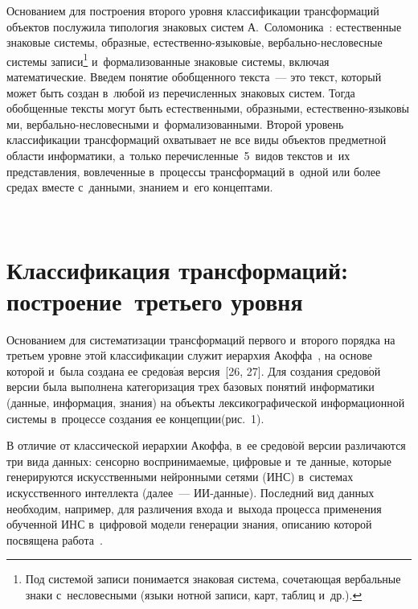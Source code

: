 \begin{multicols}{2}
Основанием для построения второго уровня классификации трансформаций объектов послужила типология 
знаковых сис\-тем А.~Соломоника~\cite[c.~131]{25-zac}: естественные знаковые сис\-те\-мы, образные,  
ес\-тест\-вен\-но-язы\-ко\-в$\acute{\mbox{ы}}$е,  
вер\-баль\-но-не\-сло\-вес\-ные сис\-те\-мы записи\footnote{Под системой записи понимается знаковая 
система, сочетающая вербальные знаки с~несловесными (языки нотной записи, карт, таблиц и~др.).} 
и~формализованные знаковые сис\-те\-мы, включая математические. Введем понятие обобщенного текста~--- 
это текст, который может быть создан в~любой из перечисленных знаковых систем. Тогда обобщенные тексты 
могут быть естественными, образными, ес\-тест\-вен\-но-язы\-ко\-в$\acute{\mbox{ы}}$\-ми,  
вер\-баль\-но-не\-сло\-вес\-ны\-ми и~формализованными. Второй уровень классификации трансформаций 
охватывает не все виды объектов предметной  
об\-ласти информатики, а~только перечисленные~5~видов текс\-тов и~их представления, вовлеченные 
в~процессы трансформаций в~одной или более средах вместе с~данными, знанием и~его концептами.

\begin{figure*}[b] %
\vspace*{6pt}
      \begin{center}
     \mbox{%
\epsfxsize=121.191mm 
}
\end{center}
\vspace*{-6pt}
\end{figure*}

\section{Классификация трансформаций: построение~третьего 
уровня}

  Основанием для систематизации трансформаций первого и~второго порядка 
на третьем уровне этой классификации служит иерархия Акоффа~\cite{8-zac}, 
на основе которой и~была создана ее средов$\acute{\mbox{а}}$я версия~[26, 
27]. Для создания средов$\acute{\mbox{о}}$й версии была выполнена 
категоризация трех базовых понятий информатики (данные, информация, 
знания) на объекты лексикографической информационной сис\-те\-мы 
в~процессе создания ее концепции\linebreak (рис.~1).
  


  В отличие от классической иерархии Акоффа, в~ее 
средов$\acute{\mbox{о}}$й версии различаются три вида данных: сенсорно 
воспринимаемые, цифровые и~те данные, которые генерируются 
искусственными нейронными сетями (ИНС) в~системах искусственного интеллекта 
(далее~--- ИИ-дан\-ные). Последний вид данных необходим, например, для 
различения входа и~выхода процесса применения обученной 
ИНС в~цифровой модели генерации знания, описанию которой 
посвящена работа~\cite{27-zac}.
  

\end{multicols}
